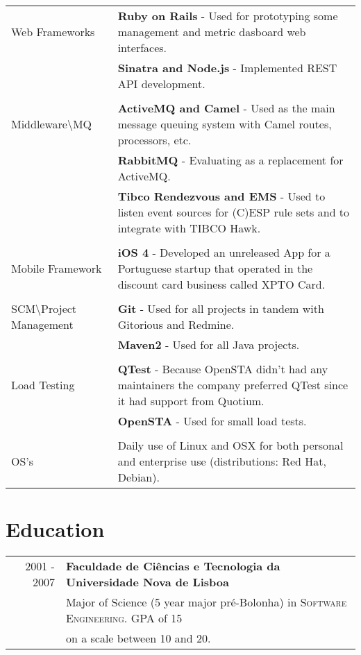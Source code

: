 \documentclass[a4paper,10pt]{article}
\begin{document}
\begin{tabular}{p{4cm}|p{9cm}}
	Web Frameworks
	& {\bf Ruby on Rails} - Used for prototyping some management and metric dasboard web interfaces. \\
	& {\bf Sinatra and Node.js} - Implemented REST API development. \\
\multicolumn{2}{c}{} \\
	Middleware\textbackslash MQ
	& {\bf ActiveMQ and Camel} - Used as the main message queuing system with Camel routes, processors, etc. \\
	& {\bf RabbitMQ} - Evaluating as a replacement for ActiveMQ. \\
	& {\bf Tibco Rendezvous and EMS} -  Used to listen event sources for (C)ESP rule sets and to integrate with TIBCO Hawk.\\
\multicolumn{2}{c}{} \\
	Mobile Framework
	&  {\bf iOS 4} - Developed an unreleased App for a Portuguese startup that operated in the discount card business called XPTO Card.\\
\multicolumn{2}{c}{} \\
	SCM\textbackslash Project Management
	& {\bf Git} - Used for all projects in tandem with Gitorious and Redmine. \\
	& {\bf Maven2} - Used for all Java projects.\\
\multicolumn{2}{c}{} \\
	Load Testing 
	& {\bf QTest} - Because OpenSTA didn't had any maintainers the company preferred QTest since it had support from Quotium. \\
	& {\bf OpenSTA} - Used for small load tests. \\
\multicolumn{2}{c}{} \\ 
	OS's
	&  Daily use of Linux and OSX for both personal and enterprise use (distributions: Red Hat, Debian). \\
\end{tabular}

\section{Education}
\begin{tabular}{rl}	
2001 - 2007 & \textbf{Faculdade de Ciências e Tecnologia da Universidade Nova de Lisboa}\\
 & Major of Science (5 year major pré-Bolonha) in \textsc{Software Engineering}. GPA of 15\\
 & on a scale between 10 and 20. \\
\end{tabular}
\end{document}
